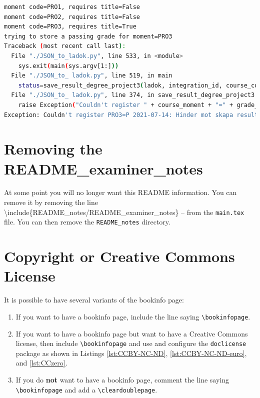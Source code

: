 \begin{lstlisting}[language={bash}, caption={Using the extracted JSON to produce a LADOK entry}, label=lst:usingExtractedJSONtoProduceLADOKentry]
moment code=PRO1, requires title=False
moment code=PRO2, requires title=False
moment code=PRO3, requires title=True
trying to store a passing grade for moment=PRO3
Traceback (most recent call last):
  File "./JSON_to_ladok.py", line 533, in <module>
    sys.exit(main(sys.argv[1:]))
  File "./JSON_to_ ladok.py", line 519, in main
    status=save_result_degree_project3(ladok, integration_id, course_code, mom['Utbildningskod'], '2021-07-14', 'P', "PF", main_title, alternative_main_title)
  File "./JSON_to_ ladok.py", line 374, in save_result_degree_project3
    raise Exception("Couldn't register " + course_moment + "=" + grade_raw + " " + result_date_raw + ": " + r.json()["Meddelande"])
Exception: Couldn't register PRO3=P 2021-07-14: Hinder mot skapa resultat påträffat: Rapporteringsrättighet saknas
\end{lstlisting}


\section{Removing the README\_examiner\_notes}
At some point you will no longer want this README information. You can remove it by removing the line
\textbackslash include\{README\_notes/README\_examiner\_notes\} -- from the \texttt{main.tex} file. You can then remove the \texttt{README\_notes} directory.

\section[Copyright or Creative Commons License]{Copyright or Creative Commons\\ License}
\label{sec:copyrightOrCClicenseExaminer}
It is possible to have several variants of the bookinfo page:
\begin{enumerate}[labelwidth =\widthof{\textbf{Creative Commons (CC)}}, leftmargin = !]
    \item[copyright] If you want to have a bookinfo page, include the line saying \texttt{\textbackslash bookinfopage}.
    \item[Creative Commons (CC)] If you want to have a bookinfo page but want to have a Creative Commons license, then include \texttt{\textbackslash bookinfopage} and use and configure the \texttt{doclicense} package as shown in Listings \ref{lst:CCBY-NC-ND}, \ref{lst:CCBY-NC-ND-euro}, and \ref{lst:CCzero}.
    \item[none] If you do \textbf{not} want to have a bookinfo page, comment the line saying \texttt{\textbackslash bookinfopage} and add a \texttt{\textbackslash cleardoublepage}.
\end{enumerate}

